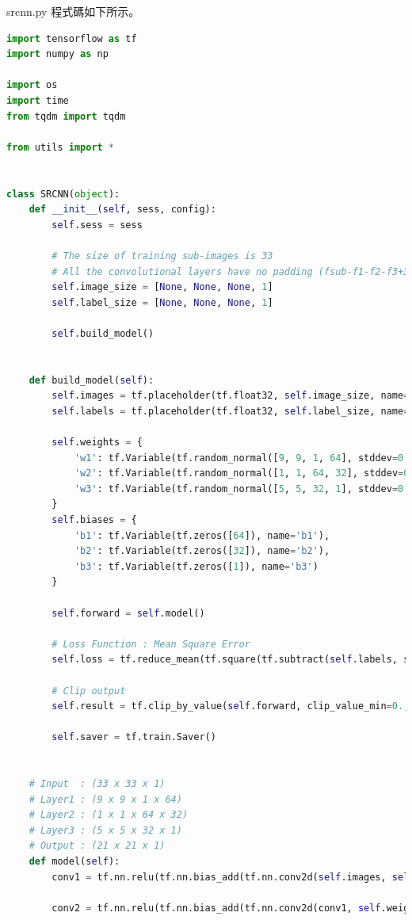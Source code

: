 \documentclass[11pt,UTF8]{ctexart}
\begin{document}
srcnn.py 程式碼如下所示。

	\begin{lstlisting}[language={python}]
import tensorflow as tf
import numpy as np

import os
import time
from tqdm import tqdm

from utils import *


class SRCNN(object):
    def __init__(self, sess, config):
        self.sess = sess

        # The size of training sub-images is 33
        # All the convolutional layers have no padding (fsub-f1-f2-f3+3) = (33-5-9-1+3) = 21
        self.image_size = [None, None, None, 1]
        self.label_size = [None, None, None, 1]

        self.build_model()
    

    def build_model(self):
        self.images = tf.placeholder(tf.float32, self.image_size, name='images')
        self.labels = tf.placeholder(tf.float32, self.label_size, name='labels')

        self.weights = {
            'w1': tf.Variable(tf.random_normal([9, 9, 1, 64], stddev=0.001), name='w1'),
            'w2': tf.Variable(tf.random_normal([1, 1, 64, 32], stddev=0.001), name='w2'),
            'w3': tf.Variable(tf.random_normal([5, 5, 32, 1], stddev=0.001), name='w3')
        }
        self.biases = {
            'b1': tf.Variable(tf.zeros([64]), name='b1'),
            'b2': tf.Variable(tf.zeros([32]), name='b2'),
            'b3': tf.Variable(tf.zeros([1]), name='b3')
        }

        self.forward = self.model()

        # Loss Function : Mean Square Error
        self.loss = tf.reduce_mean(tf.square(tf.subtract(self.labels, self.forward)))

        # Clip output
        self.result = tf.clip_by_value(self.forward, clip_value_min=0., clip_value_max=1.)

        self.saver = tf.train.Saver()


    # Input  : (33 x 33 x 1)
    # Layer1 : (9 x 9 x 1 x 64)
    # Layer2 : (1 x 1 x 64 x 32)
    # Layer3 : (5 x 5 x 32 x 1)
    # Output : (21 x 21 x 1)
    def model(self):
        conv1 = tf.nn.relu(tf.nn.bias_add(tf.nn.conv2d(self.images, self.weights['w1'], strides=[1,1,1,1], padding='VALID'), self.biases['b1']))

        conv2 = tf.nn.relu(tf.nn.bias_add(tf.nn.conv2d(conv1, self.weights['w2'], strides=[1,1,1,1], padding='VALID'), self.biases['b2']))
       

\end{lstlisting}
\end{document}
